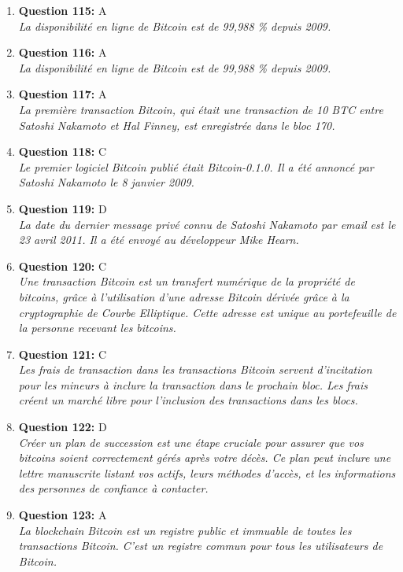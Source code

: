 \documentclass[12pt,a4paper]{article}
\begin{document}
\begin{enumerate}
\item \textbf{Question 115:} A
\\ \textit{La disponibilité en ligne de Bitcoin est de 99,988 \% depuis 2009.}

\item \textbf{Question 116:} A
\\ \textit{La disponibilité en ligne de Bitcoin est de 99,988 \% depuis 2009.}

\item \textbf{Question 117:} A
\\ \textit{La première transaction Bitcoin, qui était une transaction de 10 BTC entre Satoshi Nakamoto et Hal Finney, est enregistrée dans le bloc 170.}

\item \textbf{Question 118:} C
\\ \textit{Le premier logiciel Bitcoin publié était Bitcoin-0.1.0. Il a été annoncé par Satoshi Nakamoto le 8 janvier 2009.}

\item \textbf{Question 119:} D
\\ \textit{La date du dernier message privé connu de Satoshi Nakamoto par email est le 23 avril 2011. Il a été envoyé au développeur Mike Hearn.}

\item \textbf{Question 120:} C
\\ \textit{Une transaction Bitcoin est un transfert numérique de la propriété de bitcoins, grâce à l'utilisation d'une adresse Bitcoin dérivée grâce à la cryptographie de Courbe Elliptique. Cette adresse est unique au portefeuille de la personne recevant les bitcoins.}

\item \textbf{Question 121:} C
\\ \textit{Les frais de transaction dans les transactions Bitcoin servent d'incitation pour les mineurs à inclure la transaction dans le prochain bloc. Les frais créent un marché libre pour l'inclusion des transactions dans les blocs.}

\item \textbf{Question 122:} D
\\ \textit{Créer un plan de succession est une étape cruciale pour assurer que vos bitcoins soient correctement gérés après votre décès. Ce plan peut inclure une lettre manuscrite listant vos actifs, leurs méthodes d'accès, et les informations des personnes de confiance à contacter.}

\item \textbf{Question 123:} A
\\ \textit{La blockchain Bitcoin est un registre public et immuable de toutes les transactions Bitcoin. C'est un registre commun pour tous les utilisateurs de Bitcoin.}


\end{enumerate}
\end{document}
